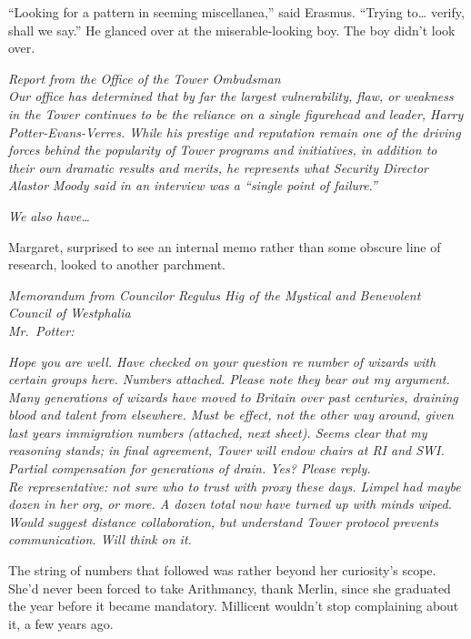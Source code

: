 ``Looking for a pattern in seeming miscellanea,'' said Erasmus. ``Trying
to\ldots{} verify, shall we say.'' He glanced over at the
miserable-looking boy. The boy didn't look over.

\mybreak

\emph{Report from the Office of the Tower Ombudsman}\\

\emph{Our office has determined that by far the largest vulnerability,
flaw, or weakness in the Tower continues to be the reliance on a single
figurehead and leader, Harry Potter-Evans-Verres. While his prestige and
reputation remain one of the driving forces behind the popularity of
Tower programs and initiatives, in addition to their own dramatic
results and merits, he represents what Security Director Alastor Moody
said in an interview was a ``single point of failure.''}

\emph{We also have\ldots{}}

Margaret, surprised to see an internal memo rather than some obscure
line of research, looked to another parchment.

\mybreak

\emph{Memorandum from Councilor Regulus Hig of the Mystical and
Benevolent Council of Westphalia}\\

\noindent\emph{Mr.~Potter:}

\emph{Hope you are well. Have checked on your question re number of
wizards with certain groups here. Numbers attached. Please note they
bear out my argument. Many generations of wizards have moved to Britain
over past centuries, draining blood and talent from elsewhere. Must be
effect, not the other way around, given last years immigration numbers
(attached, next sheet). Seems clear that my reasoning stands; in final
agreement, Tower will endow chairs at RI and SWI. Partial compensation
for generations of drain. Yes? Please reply.}\\

\emph{Re representative: not sure who to trust with proxy these days.
Limpel had maybe dozen in her org, or more. A dozen total now have
turned up with minds wiped. Would suggest distance collaboration, but
understand Tower protocol prevents communication. Will think on it.}


\mybreak

The string of numbers that followed was rather beyond her curiosity's
scope. She'd never been forced to take Arithmancy, thank Merlin, since
she graduated the year before it became mandatory. Millicent wouldn't
stop complaining about it, a few years ago.

